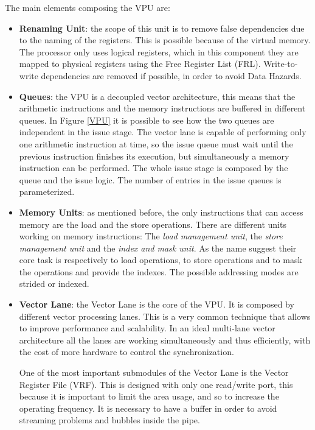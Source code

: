 The main elements composing the VPU are:
\begin{itemize}
    \item \textbf{Renaming Unit}: the scope of this unit is to remove false dependencies due to the naming of the registers. This is possible because of the virtual memory. The processor only uses logical registers, which in this component they are mapped to physical registers using the Free Register List (FRL).
    Write-to-write dependencies are removed if possible, in order to avoid Data Hazards.
 
    \item \textbf{Queues}: the VPU is a decoupled vector architecture, this means that the arithmetic instructions and the memory instructions are buffered in different queues.
    In Figure \ref{VPU} it is possible to see how the two queues are independent in the issue stage.
    The vector lane is capable of performing only one arithmetic instruction at time, so the issue queue must wait until the previous instruction finishes its execution, but simultaneously a memory instruction can be performed.
    The whole issue stage is composed by the queue and the issue logic. The number of entries in the issue queues is parameterized.
    
    \item \textbf{Memory Units}: as mentioned before, the only instructions that can access memory are the load and the store operations. There are different units working on memory instructions: The \emph{load management unit}, the \emph{store management unit} and the \emph{index and mask unit}. As the name suggest their core task is respectively to load operations, to store operations and to mask the operations and provide the indexes.
    The possible addressing modes are strided or indexed.
    
    \item \textbf{Vector Lane}: the Vector Lane is the core of the VPU. It is composed by different vector processing lanes. This is a very common technique that allows to improve performance and scalability.
    In an ideal multi-lane vector architecture all the lanes are working simultaneously and thus efficiently, with the cost of more hardware to control the synchronization.
    
    One of the most important submodules of the Vector Lane is the Vector Register File (VRF). This is designed with only one read/write port, this because it is important to limit the area usage, and so to increase the operating frequency. It is necessary to have a buffer in order to avoid streaming problems and bubbles inside the pipe.
    

\end{itemize}
